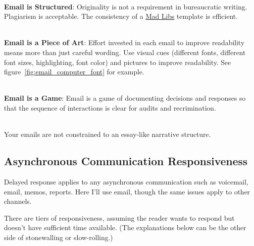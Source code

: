 \ \\
\textbf{Email is Structured}: Originality is not a requirement in bureaucratic writing. Plagiarism is acceptable. The consistency of a 
\href{https://en.wikipedia.org/wiki/Mad_Libs}{Mad Libs} 
\iftoggle{WPinmargin}{\marginpar{[Wikipedia] Mad Libs}}{}
template is efficient.  

\ \\
\textbf{Email is a Piece of Art}: Effort invested in each email to improve readability means more than just careful wording. 
Use visual cues (different fonts, different font sizes, highlighting, font color) and pictures to improve readability. See figure~\ref{fig:email_computer_font} for example.

\ \\
\textbf{Email is a Game}: Email is a game of documenting decisions and responses so that the sequence of interactions is clear for audits and recrimination. 

\ \\
Your emails are not constrained to an essay-like narrative structure. 

\subsection*{Asynchronous Communication Responsiveness\label{sec:email-responsiveness}}

Delayed response applies to any asynchronous communication such as voicemail, email, memos, reports. Here I'll use email, though the same issues apply to other channels.


There are tiers of responsiveness, assuming the reader wants to respond but doesn't have sufficient time available.
(The explanations below can be the other side of \gls{stonewalling} or \gls{slow-rolling}.)
\marginpar{[Glossary]}

